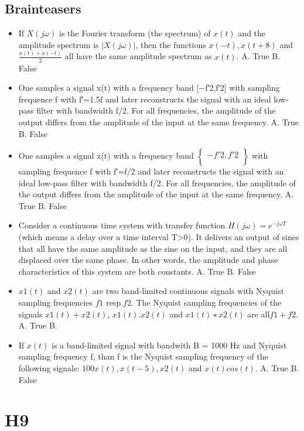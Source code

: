 \documentclass{document}
\begin{document}
	\subsection{Brainteasers}
	\begin{itemize}
		\item If $X(j\omega)$ is the Fourier transform (the spectrum) of $x(t)$ and the amplitude spectrum is $|X(j\omega)|$, then the functions $x(−t), x(t+8)$ and $\frac{x(t)+x(−t)}{2}$ all have the same amplitude spectrum as $x(t)$.
		A. True
		B. False
		\item One samples a signal x(t) with a frequency band [−f′2,f′2] with sampling frequence f with f′=1.5f and later reconstructs the signal with an ideal low-pass filter with bandwidth f/2. For all frequencies, the amplitude of the output differs from the amplitude of the input at the same frequency.
		A. True
		B. False
		\item One samples a signal x(t) with a frequency band $\begin{Bmatrix}
			−f′2,f′2\\
		\end{Bmatrix}$ with sampling frequence f with f′=f/2 and later reconstructs the signal with an ideal low-pass filter with bandwidth f/2. For all frequencies, the amplitude of the output differs from the amplitude of the input at the same frequency.
		A. True
		B. False
		\item Consider a continuous time system with transfer function $H(j\omega)=e^{-j\omega T}$ (which means a delay over a time interval T>0). It delivers an output of sines that all have the same amplitude as the sine on the input, and they are all displaced over the same phase. In other words, the amplitude and phase characteristics of this system are both constants.
		A. True
		B. False
		\item $x1(t)$ and $x2(t)$ are two band-limited continuous signals with Nyquist sampling frequencies $f1$ resp.$ f2$. The Nyquist sampling frequencies of the signals $x1(t)+x2(t)$, $x1(t).x2(t)$ and $x1(t)∗x2(t)$ are all$ f1+f2$.
		A. True
		B. 
		\item If $x(t)$ is a band-limited signal with bandwith B = 1000 Hz and Nyquist sampling frequency f, than f is the Nyquist sampling frequency of the following signals: $100x(t), x(t−5), x2(t)$ and $x(t)cos(t).$
		A. True
		B. False
	\end{itemize}
	\section{H9}
\end{document}
